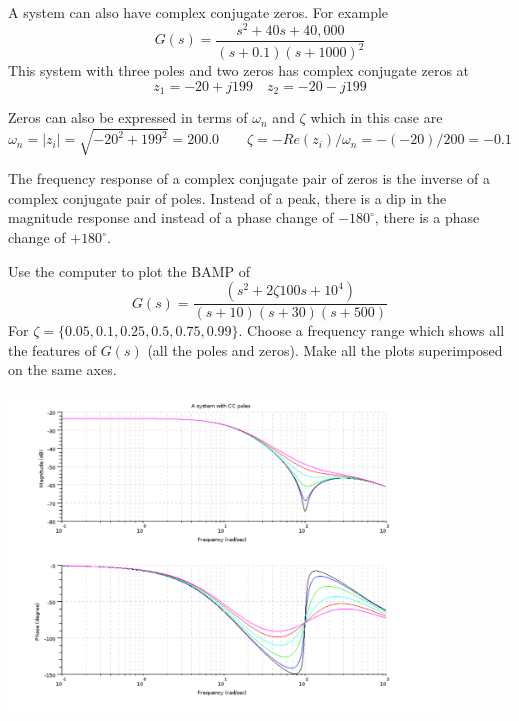 A system can also have complex conjugate zeros.  For example
\[
G(s) = \frac  {s^2 + 40s + 40,000}   {(s+0.1)(s+1000)^2}
\]
This system with three poles and two zeros has complex conjugate zeros at
\[
z_1 = -20+j199 \quad z_2 = -20-j199
\]


Zeros can also be expressed in terms of $\omega_n$ and $\zeta$ which in this case are
\[
\omega_n = |z_i| = \sqrt{-20^2 + 199^2} = 200.0 \qquad \zeta = -Re(z_i)/ \omega_n = -(-20)/200 = -0.1
\]

The frequency response of a complex conjugate pair of zeros is the inverse of a complex conjugate pair of poles.   Instead of a peak, there is a dip in the magnitude response and instead of a phase change of $-180^\circ$, there is a phase change of $+180^\circ$.

\begin{ExampleSmall}
Use the computer to plot the BAMP of
\[
G(s) =  \frac   {(s^2 + 2\zeta100s + 10^4)}   {(s+10)(s+30)(s+500)}
\]
For $\zeta = \{0.05, 0.1, 0.25, 0.5, 0.75, 0.99\}$.   Choose a frequency range which shows all the features of $G(s)$ (all the poles and zeros).   Make all the plots superimposed on the same axes.


\includegraphics[width=4.5in]{figs05/zzetasbodea.png}

\end{ExampleSmall}





























